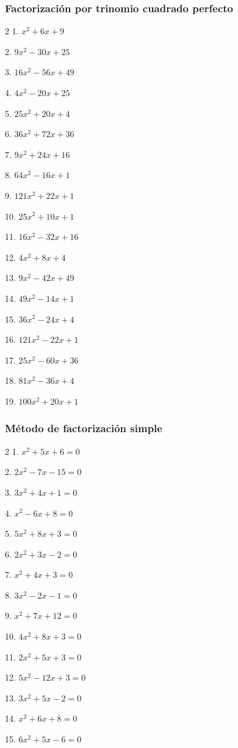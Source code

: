 \documentclass[12pt]{article}
\begin{document}
\subsubsection{Factorización por trinomio cuadrado
perfecto}\label{factorizaciuxf3n-por-trinomio-cuadrado-perfecto}
\begin{multicols}{2}
1. $x^2 + 6x + 9$

2. $9x^2 - 30x + 25$

3. $16x^2 - 56x + 49$

4. $4x^2 - 20x + 25$

5. $25x^2 + 20x + 4$

6. $36x^2 + 72x + 36$

7. $9x^2 + 24x + 16$

8. $64x^2 - 16x + 1$

9. $121x^2 + 22x + 1$

10. $25x^2 + 10x + 1$

11. $16x^2 - 32x + 16$

12. $4x^2 + 8x + 4$

13. $9x^2 - 42x + 49$

14. $49x^2 - 14x + 1$

15. $36x^2 - 24x + 4$

16. $121x^2 - 22x + 1$

17. $25x^2 - 60x + 36$

18. $81x^2 - 36x + 4$

19. $100x^2 + 20x + 1$

\end{multicols}


\subsubsection{Método de factorización
simple}\label{muxe9todo-de-factorizaciuxf3n-simple}
\begin{multicols}{2}
1. $x^2 + 5x + 6 = 0$

2. $2x^2 - 7x - 15 = 0$

3. $3x^2 + 4x + 1 = 0$

4. $x^2 - 6x + 8 = 0$

5. $5x^2 + 8x + 3 = 0$

6. $2x^2 + 3x - 2 = 0$

7. $x^2 + 4x + 3 = 0$

8. $3x^2 - 2x - 1 = 0$

9. $x^2 + 7x + 12 = 0$

10. $4x^2 + 8x + 3 = 0$

11. $2x^2 + 5x + 3 = 0$

12. $5x^2 - 12x + 3 = 0$

13. $3x^2 + 5x - 2 = 0$

14. $x^2 + 6x + 8 = 0$

15. $6x^2 + 5x - 6 = 0$
\end{multicols}
\end{document}
